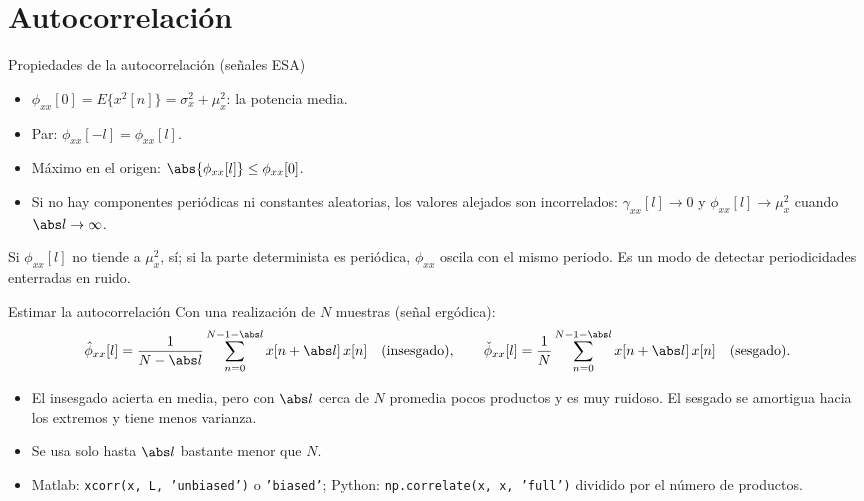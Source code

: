 \documentclass[aspectratio=169,11pt]{beamer}
\begin{document}
\section{Autocorrelación}

\begin{frame}{Propiedades de la autocorrelación (señales ESA)}
  \small
  \begin{itemize}
    \item $\phi_{xx}[0]=E\{x^2[n]\}=\sigma_x^2+\mu_x^2$: la \alert{potencia} media.
    \item Par: $\phi_{xx}[-l]=\phi_{xx}[l]$.
    \item Máximo en el origen: $\abs{\phi_{xx}[l]}\le\phi_{xx}[0]$.
    \item Si no hay componentes periódicas ni constantes aleatorias, los valores alejados son incorrelados: $\gamma_{xx}[l]\to0$ y $\phi_{xx}[l]\to\mu_x^2$ cuando $\abs l\to\infty$.
  \end{itemize}
  \begin{importante}
    Si $\phi_{xx}[l]$ no tiende a $\mu_x^2$, sí; si la parte determinista es periódica, $\phi_{xx}$ oscila con el mismo periodo. Es un modo de detectar periodicidades enterradas en ruido.
  \end{importante}
\end{frame}

\begin{frame}{Estimar la autocorrelación}
  \footnotesize
  Con una realización de $N$ muestras (señal ergódica):
  \[
    \hat\phi_{xx}[l]=\frac1{N-\abs l}\sum_{n=0}^{N-1-\abs l}x[n+\abs l]\,x[n]\quad\text{(insesgado)},\qquad
    \check\phi_{xx}[l]=\frac1N\sum_{n=0}^{N-1-\abs l}x[n+\abs l]\,x[n]\quad\text{(sesgado)}.
  \]
  \begin{itemize}
    \item El insesgado acierta en media, pero con $\abs l$ cerca de $N$ promedia pocos productos y es muy ruidoso. El sesgado se amortigua hacia los extremos y tiene menos varianza.
    \item Se usa solo hasta $\abs l$ bastante menor que $N$.
    \item Matlab: \texttt{xcorr(x, L, 'unbiased')} o \texttt{'biased'}; Python: \texttt{np.correlate(x, x, 'full')} dividido por el número de productos.
  \end{itemize}
\end{frame}
\end{document}
